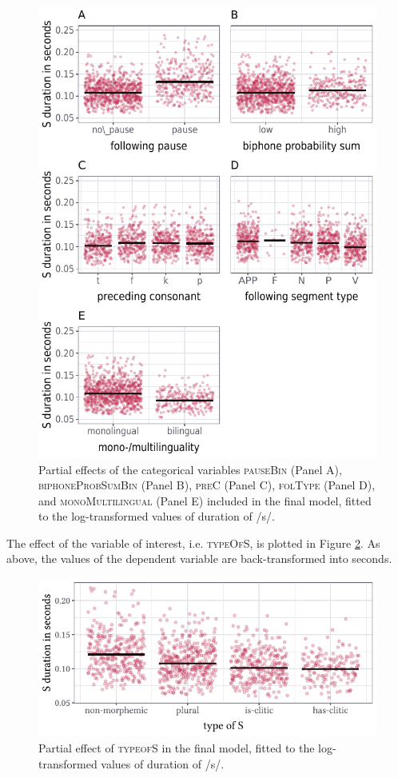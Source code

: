 \begin{figure}
    \centering
    \includegraphics[]{figures/fig4.5.pdf}
    \caption{Partial effects of the categorical variables \textsc{pauseBin} (Panel A), \textsc{biphoneProbSumBin} (Panel B), \textsc{preC} (Panel C), \textsc{folType} (Panel D), and \textsc{monoMultilingual} (Panel E) included in the final model, fitted to the log-transformed values of duration of /s/.}
    \label{fig:4_5}
\end{figure}

The effect of the variable of interest, i.e. \textsc{typeOfS}, is plotted in Figure \ref{fig:4_6}. As above, the values of the dependent variable are back-transformed into seconds.

\begin{figure}
    \centering
    \includegraphics[width=1\textwidth]{figures/fig4.6.pdf}
    \caption{Partial effect of \textsc{typeofS} in the final model, fitted to the log-transformed values of duration of /s/.}
    \label{fig:4_6}
\end{figure}

